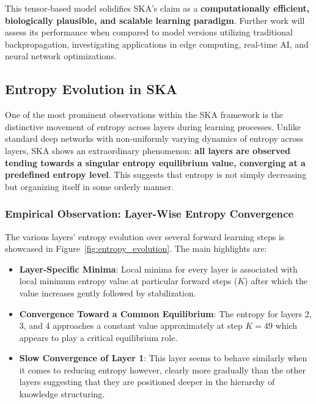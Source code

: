 \documentclass{article}
\begin{document}
This tensor-based model solidifies SKA’s claim as a \textbf{computationally efficient, biologically plausible, and scalable learning paradigm}. Further work will assess its performance when compared to model versions utilizing traditional backpropagation, investigating applications in edge computing, real-time AI, and neural network optimizations.

\subsection{Entropy Evolution in SKA}

One of the most prominent observations within the SKA framework is the distinctive movement of entropy across layers during learning processes. Unlike standard deep networks with non-uniformly varying dynamics of entropy across layers, SKA shows an extraordinary phenomenon: \textbf{all layers are observed tending towards a singular entropy equilibrium value, converging at a predefined entropy level}. This suggests that entropy is not simply decreasing but organizing itself in some orderly manner.

\subsubsection{Empirical Observation: Layer-Wise Entropy Convergence}

The various layers’ entropy evolution over several forward learning steps is showcased in Figure~\ref{fig:entropy_evolution}. The main highlights are:

\begin{itemize}

	\item \textbf{Layer-Specific Minima}: Local minima for every layer is associated with local minimum entropy value at particular forward steps (\(K\)) after which the value increases gently followed by stabilization.

	\item \textbf{Convergence Toward a Common Equilibrium}: The entropy for layers 2, 3, and 4 approaches a constant value approximately at step \(K=49\) which appears to play a critical equilibrium role.

	\item \textbf{Slow Convergence of Layer 1}: This layer seems to behave similarly when it comes to reducing entropy however, clearly more gradually than the other layers suggesting that they are positioned deeper in the hierarchy of knowledge structuring.

\end{itemize}
\end{document}
